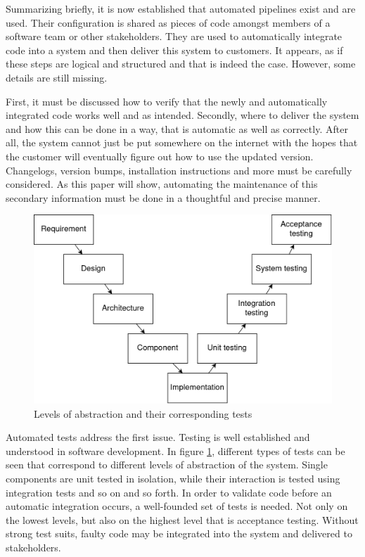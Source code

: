 Summarizing briefly, it is now established that automated pipelines exist and are used.
Their configuration is shared as pieces of code amongst members of a software team or other stakeholders.
They are used to automatically integrate code into a system and then deliver this system to customers.
It appears, as if these steps are logical and structured and that is indeed the case.
However, some details are still missing.

First, it must be discussed how to verify that the newly and automatically integrated code works well and as intended.
Secondly, where to deliver the system and how this can be done in a way, that is automatic as well as correctly.
After all, the system cannot just be put somewhere on the internet with the hopes that the customer will eventually figure out how to use the updated version.
Changelogs, version bumps, installation instructions and more must be carefully considered.
As this paper will show,  automating the maintenance of this secondary information must be done in a thoughtful and precise manner.

\begin{figure}[H]
\centering
\includegraphics[width=0.5\textheight]{img/introduction/software-testing-v.drawio}
\caption{Levels of abstraction and their corresponding tests}
\label{fig:levels-of-abstraction-and-tests}
\end{figure}

Automated tests address the first issue.
Testing is well established and understood in software development.
In figure \ref{fig:levels-of-abstraction-and-tests}, different types of tests can be seen that correspond to different levels of abstraction of the system.
Single components are unit tested in isolation, while their interaction is tested using integration tests and so on and so forth.
In order to validate code before an automatic integration occurs, a well-founded set of tests is needed.
Not only on the lowest levels, but also on the highest level that is acceptance testing.
Without strong test suits,  faulty code may be integrated into the system and delivered to stakeholders.


